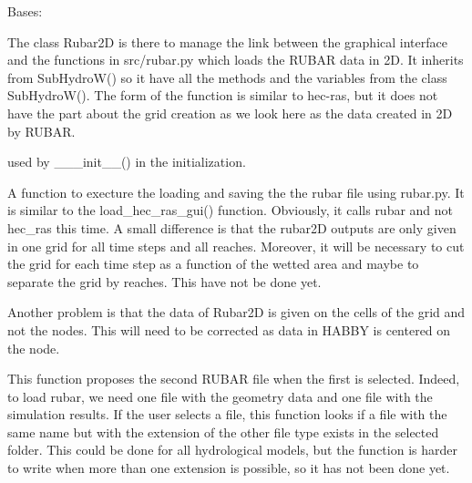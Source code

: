 \documentclass[letterpaper,10pt,english]{sphinxmanual}
\begin{document}
\begin{fulllineitems}
\label{\detokenize{index:src_GUI.hydro_GUI_2.Rubar2D}}
Bases: {\hyperref[\detokenize{index:src_GUI.hydro_GUI_2.SubHydroW}]{}}

The class Rubar2D is there to manage the link between the graphical interface and the functions in src/rubar.py
which loads the RUBAR data in 2D. It inherits from SubHydroW() so it have all the methods and the variables from
the class SubHydroW(). The form of the function is similar to hec-ras, but it does not have the part about the grid
creation as we look here as the data created in 2D by RUBAR.

\begin{fulllineitems}
\label{\detokenize{index:src_GUI.hydro_GUI_2.Rubar2D.init_iu}}
used by \_\_\_init\_\_() in the initialization.

\end{fulllineitems}


\begin{fulllineitems}
\label{\detokenize{index:src_GUI.hydro_GUI_2.Rubar2D.load_rubar}}
A function to execture the loading and saving the the rubar file using rubar.py. It is similar to the
load\_hec\_ras\_gui() function. Obviously, it calls rubar and not hec\_ras this time. A small difference is that
the rubar2D outputs are only given in one grid for all time steps and all reaches. Moreover, it will be
necessary to cut the grid for each time step as a function of the wetted area and maybe to separate the
grid by reaches. This have not be done yet.

Another problem is that the data of Rubar2D is given on the cells of the grid and not the nodes.
This will need to be corrected as data in HABBY is centered on the node.

\end{fulllineitems}


\begin{fulllineitems}
\label{\detokenize{index:src_GUI.hydro_GUI_2.Rubar2D.propose_next_file}}
This function proposes the second RUBAR file when the first is selected.  Indeed, to load rubar, we need
one file with the geometry data and one file with the simulation results. If the user selects a file, this
function looks if a file with the same name but with the extension of the other file type exists in the
selected folder. This could be done for all hydrological models, but the function is harder
to write when more than one extension is possible, so it has not been done yet.


\end{fulllineitems}
\end{fulllineitems}
\end{document}
